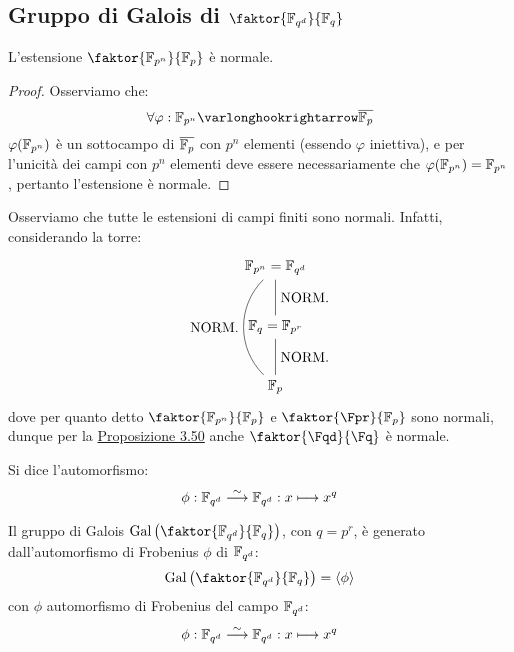 \documentclass[11pt]{scrartcl}
\begin{document}
\newpage
\subsection{Gruppo di Galois di $\faktor{\F{q^d}}{\F{q}}$}

\begin{proposition}[$\faktor{\F{p^n}}{\F{p}}$]
    L'estensione $\faktor{\F{p^n}}{\F{p}}$ è normale.
\end{proposition}

\begin{proof}
    Osserviamo che:
    \[ \forall \varphi : \Fpn \varlonghookrightarrow \overline \Fp
        \]
    $\varphi(\mathbb{F}_{p^{n}})$ è un sottocampo di $\overline{{\mathbb F}_p}$ con $p^n$ elementi (essendo $\varphi$ iniettiva), e per l'unicità dei campi con $p^n$ elementi deve essere necessariamente che $\varphi(\mathbb{F}_{p^{n}}) = \mathbb{F}_{p^{n}}$,
    pertanto l'estensione è normale.
\end{proof}

\begin{remark}
    Osserviamo che tutte le estensioni di campi finiti sono normali. Infatti, considerando la torre:
    \[\begin{tikzpicture}
        \node (Q1) at (0,-1.5) {$\Fp$};
        \node (Q3) at (0,0) {$\F{q} = \F{p^r}$};
        \node (Q4) at (0,1.5) {$\Fpn = \F{q^d}$};
        \draw (Q4)--(Q3) node [right, yshift=-0.75cm] {NORM.};
        \draw (Q1)--(Q3) node [right, yshift=0.75cm] {NORM.};
        \draw(Q4) to [bend right=45] (Q1) node[left, yshift=1.20cm, xshift=-0.5cm] {NORM.};
    \end{tikzpicture}
        \]
    dove per quanto detto $\faktor{\Fpn}{\Fp}$ e $\faktor{\Fpr}{\Fp}$ sono normali, dunque per la \hyperref[3.50]{Proposizione 3.50} anche $\faktor{\Fqd}{\Fq}$ è normale.
\end{remark}

\begin{definition}
    Si dice  l'automorfismo:
    \[ \phi : \mathbb{F}_{q^d} \overset{\sim}{\longrightarrow} \mathbb{F}_{q^d} : x \longmapsto x^q
        \]
\end{definition}

\begin{theorem}
    Il gruppo di Galois $\Gal\left(\faktor{\F{q^d}}{\F{q}}\right)$, con $q = p^r$, è generato dall'automorfismo di Frobenius $\phi$ di $\mathbb{F}_{q^d}$:
    \[ \Gal\left(\faktor{\F{q^d}}{\F{q}}\right) = \left<\phi\right>
        \]
    con $\phi$ automorfismo di Frobenius del campo $\mathbb{F}_{q^d}$:
    \[ \phi : \mathbb{F}_{q^d} \overset{\sim}{\longrightarrow} \mathbb{F}_{q^d} : x \longmapsto x^q
        \]
\end{theorem}
\end{document}
